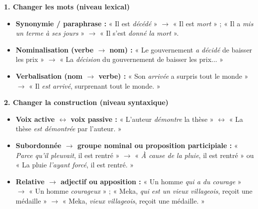 \documentclass[11pt]{article}
\begin{document}
\begin{propriete}
\textbf{1. Changer les mots (niveau lexical)}
\begin{itemize}
    \item \textbf{Synonymie / paraphrase :} « Il est \emph{décédé} » $\to$ « Il est \emph{mort} » ; « Il a \emph{mis un terme à ses jours} » $\to$ « Il s'est \emph{donné la mort} ».
    \item \textbf{Nominalisation (verbe $\to$ nom) :} « Le gouvernement \emph{a décidé} de baisser les prix » $\to$ « La \emph{décision} du gouvernement de baisser les prix... »
    \item \textbf{Verbalisation (nom $\to$ verbe) :} « Son \emph{arrivée} a surpris tout le monde » $\to$ « Il \emph{est arrivé}, surprenant tout le monde. »
\end{itemize}
\textbf{2. Changer la construction (niveau syntaxique)}
\begin{itemize}
    \item \textbf{Voix active $\leftrightarrow$ voix passive :} « L'auteur \emph{démontre} la thèse » $\leftrightarrow$ « La thèse \emph{est démontrée} par l'auteur. »
    \item \textbf{Subordonnée $\to$ groupe nominal ou proposition participiale :} « \emph{Parce qu'il pleuvait}, il est rentré » $\to$ « \emph{À cause de la pluie}, il est rentré » ou « La pluie \emph{l'ayant forcé}, il est rentré. »
    \item \textbf{Relative $\to$ adjectif ou apposition :} « Un homme \emph{qui a du courage} » $\to$ « Un homme \emph{courageux} » ; « Meka, \emph{qui est un vieux villageois}, reçoit une médaille » $\to$ « Meka, \emph{vieux villageois}, reçoit une médaille. »
\end{itemize}
\end{propriete}
\end{document}
